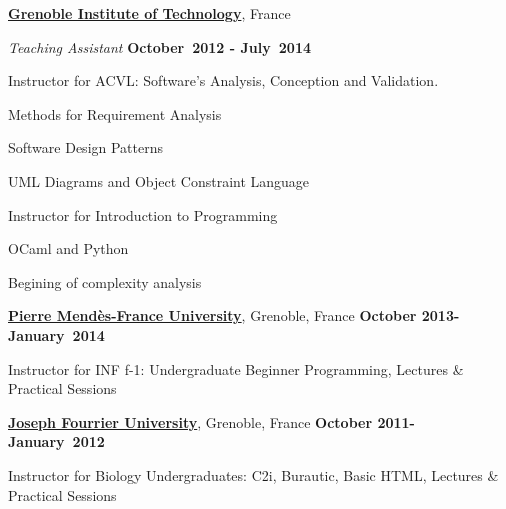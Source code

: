 \documentclass[10pt]{article}
\newcommand{\halfblankline}{\quad\vspace{-0.5\baselineskip}\pagebreak[3]}
\begin{document}
\href{http://www.grenoble-inp.fr/grenoble-institute-of-technology-9224.kjsp?RH=INPG_FR}{\textbf{Grenoble Institute of Technology}}, France
\begin{outerlist}
\item[] \textit{Teaching Assistant}%
    \hfill \textbf{October~2012 - July~2014}
    \begin{innerlist}
        \item Instructor for ACVL: Software’s Analysis, Conception and Validation.
            \begin{innerlist}
                \item Methods for Requirement Analysis
                \item Software Design Patterns
                \item UML Diagrams and Object Constraint Language 
            \end{innerlist}
          \item Instructor for Introduction to Programming
            \begin{innerlist}
                 \item OCaml and Python
                 \item Begining of complexity analysis
             \end{innerlist}
    \end{innerlist}
\end{outerlist}
\halfblankline

\href{http://www.upmf-grenoble.fr/}{\textbf{Pierre Mendès-France University}},
Grenoble, France  \hfill \textbf{October 2013- January~2014}
\begin{outerlist}

\item[] %
   
    \begin{innerlist}
        \item Instructor for INF f-1: Undergraduate Beginner Programming, Lectures \& Practical Sessions
    \end{innerlist}
\end{outerlist}
\halfblankline

\href{https://www.ujf-grenoble.fr/}{\textbf{Joseph Fourrier University}},
Grenoble, France    \hfill \textbf{October 2011- January~2012}
\begin{outerlist}
\item[] %
    \begin{innerlist}
        \item Instructor for Biology Undergraduates:  C2i, Burautic, Basic HTML,  Lectures \& Practical Sessions
    \end{innerlist}
\end{outerlist}
\end{document}
